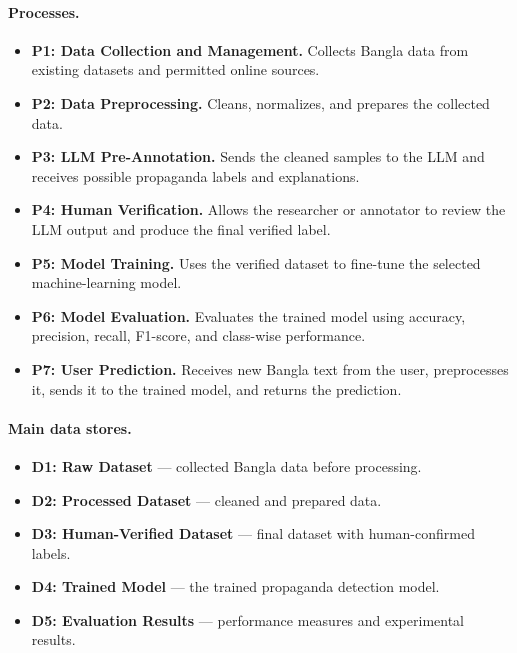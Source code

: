 \paragraph{Processes.}
\begin{itemize}
  \item \textbf{P1: Data Collection and Management.} Collects Bangla data from
        existing datasets and permitted online sources.
  \item \textbf{P2: Data Preprocessing.} Cleans, normalizes, and prepares the
        collected data.
  \item \textbf{P3: LLM Pre-Annotation.} Sends the cleaned samples to the LLM and
        receives possible propaganda labels and explanations.
  \item \textbf{P4: Human Verification.} Allows the researcher or annotator to
        review the LLM output and produce the final verified label.
  \item \textbf{P5: Model Training.} Uses the verified dataset to fine-tune the
        selected machine-learning model.
  \item \textbf{P6: Model Evaluation.} Evaluates the trained model using accuracy,
        precision, recall, F1-score, and class-wise performance.
  \item \textbf{P7: User Prediction.} Receives new Bangla text from the user,
        preprocesses it, sends it to the trained model, and returns the prediction.
\end{itemize}

\paragraph{Main data stores.}
\begin{itemize}
  \item \textbf{D1: Raw Dataset} --- collected Bangla data before processing.
  \item \textbf{D2: Processed Dataset} --- cleaned and prepared data.
  \item \textbf{D3: Human-Verified Dataset} --- final dataset with human-confirmed
        labels.
  \item \textbf{D4: Trained Model} --- the trained propaganda detection model.
  \item \textbf{D5: Evaluation Results} --- performance measures and experimental
        results.
\end{itemize}

